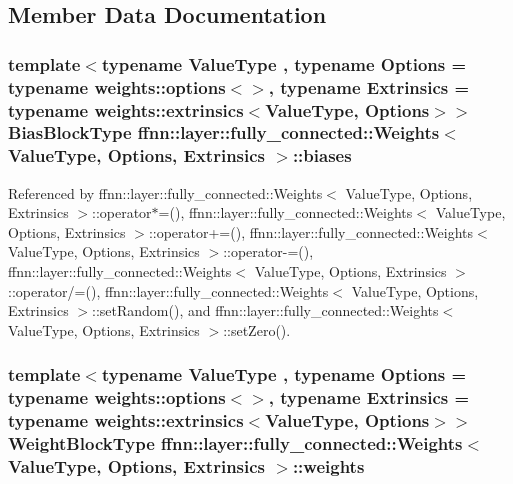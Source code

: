 \subsection{Member Data Documentation}
\hypertarget{classffnn_1_1layer_1_1fully__connected_1_1_weights_ac2ab5399d4525f4b75959a9d8d7f994a}{
\subsubsection[{biases}]{\setlength{\rightskip}{0pt plus 5cm}template$<$typename Value\-Type , typename Options  = typename weights\-::options$<$$>$, typename Extrinsics  = typename weights\-::extrinsics$<$\-Value\-Type, Options$>$$>$ {\bf Bias\-Block\-Type} {\bf ffnn\-::layer\-::fully\-\_\-connected\-::\-Weights}$<$ Value\-Type, Options, Extrinsics $>$\-::biases}}\label{classffnn_1_1layer_1_1fully__connected_1_1_weights_ac2ab5399d4525f4b75959a9d8d7f994a}


Referenced by ffnn\-::layer\-::fully\-\_\-connected\-::\-Weights$<$ Value\-Type, Options, Extrinsics $>$\-::operator$\ast$=(), ffnn\-::layer\-::fully\-\_\-connected\-::\-Weights$<$ Value\-Type, Options, Extrinsics $>$\-::operator+=(), ffnn\-::layer\-::fully\-\_\-connected\-::\-Weights$<$ Value\-Type, Options, Extrinsics $>$\-::operator-\/=(), ffnn\-::layer\-::fully\-\_\-connected\-::\-Weights$<$ Value\-Type, Options, Extrinsics $>$\-::operator/=(), ffnn\-::layer\-::fully\-\_\-connected\-::\-Weights$<$ Value\-Type, Options, Extrinsics $>$\-::set\-Random(), and ffnn\-::layer\-::fully\-\_\-connected\-::\-Weights$<$ Value\-Type, Options, Extrinsics $>$\-::set\-Zero().

\hypertarget{classffnn_1_1layer_1_1fully__connected_1_1_weights_a9baed4c318d41e712f821c02c4cb4c4a}{
\subsubsection[{weights}]{\setlength{\rightskip}{0pt plus 5cm}template$<$typename Value\-Type , typename Options  = typename weights\-::options$<$$>$, typename Extrinsics  = typename weights\-::extrinsics$<$\-Value\-Type, Options$>$$>$ {\bf Weight\-Block\-Type} {\bf ffnn\-::layer\-::fully\-\_\-connected\-::\-Weights}$<$ Value\-Type, Options, Extrinsics $>$\-::weights}}\label{classffnn_1_1layer_1_1fully__connected_1_1_weights_a9baed4c318d41e712f821c02c4cb4c4a}


